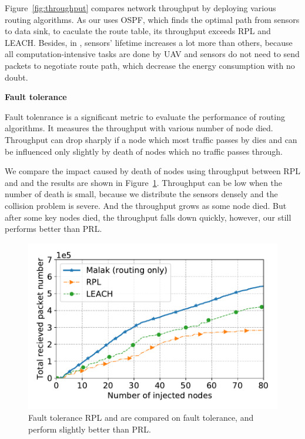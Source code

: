 Figure~\ref{fig:throughput} compares network throughput by deploying various
routing algorithms. As our {\sdn} uses OSPF, which finds the optimal path from
sensors to data sink, to caculate the route table, its throughput exceeds RPL
and LEACH. Besides, in {\sdn}, sensors' lifetime increases a lot more than
others, because all computation-intensive tasks are done by UAV and sensors do
not need to send packets to negotiate route path, which decrease the energy
consumption with no doubt.

\textbf{Fault tolerance}

Fault tolenrance is a significant metric to evaluate the performance of routing
algorithms. It measures the throughput with various number of node died.
Throughput can drop sharply if a node which most traffic passes by dies and can
be influenced only slightly by death of nodes which no traffic passes through.

We compare the impact caused by death of nodes using throughput between RPL and
{\sdn} and the results are shown in Figure~\ref{fig:fault_tolerance}. Throughput
can be low when the number of death is small, because we distribute the sensors
densely and the collision problem is severe. And the throughput grows as some
node died. But after some key nodes died, the throughput falls down quickly,
however, our {\sdn} still performs better than PRL.

\begin{figure}[htbp]
	\centering
	\includegraphics[width=.85\columnwidth]{Figure/fault_tolerance}
	\vspace{-0.1in}
	\caption{Fault tolerance
		\textnormal{
			RPL and {\sdn} are compared on fault tolerance, and {\sdn} perform
			slightly better than PRL.
		}}
	\label{fig:fault_tolerance}
\end{figure}


